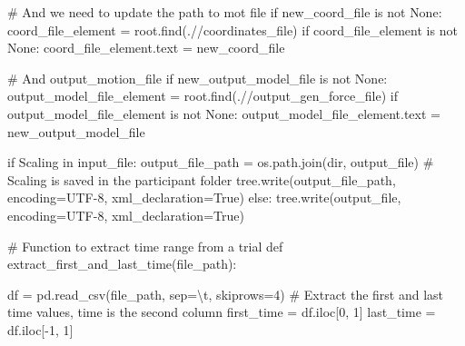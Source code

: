 \documentclass[
  letterpaper,
  DIV=11,
  numbers=noendperiod]{scrreprt}
\newenvironment{Shaded}{\begin{snugshade}}{\end{snugshade}}
\newcommand{\BuiltInTok}[1]{\textcolor[rgb]{0.00,0.23,0.31}{#1}}
\newcommand{\CharTok}[1]{\textcolor[rgb]{0.13,0.47,0.30}{#1}}
\newcommand{\CommentTok}[1]{\textcolor[rgb]{0.37,0.37,0.37}{#1}}
\newcommand{\ControlFlowTok}[1]{\textcolor[rgb]{0.00,0.23,0.31}{#1}}
\newcommand{\DecValTok}[1]{\textcolor[rgb]{0.68,0.00,0.00}{#1}}
\newcommand{\KeywordTok}[1]{\textcolor[rgb]{0.00,0.23,0.31}{#1}}
\newcommand{\NormalTok}[1]{\textcolor[rgb]{0.00,0.23,0.31}{#1}}
\newcommand{\OperatorTok}[1]{\textcolor[rgb]{0.37,0.37,0.37}{#1}}
\newcommand{\StringTok}[1]{\textcolor[rgb]{0.13,0.47,0.30}{#1}}
\newcommand{\VariableTok}[1]{\textcolor[rgb]{0.07,0.07,0.07}{#1}}
\begin{document}
\begin{Shaded}
\begin{Highlighting}[]
        \CommentTok{\# And we need to update the path to mot file}
        \ControlFlowTok{if}\NormalTok{ new\_coord\_file }\KeywordTok{is} \KeywordTok{not} \VariableTok{None}\NormalTok{:}
\NormalTok{            coord\_file\_element }\OperatorTok{=}\NormalTok{ root.find(}\StringTok{\textquotesingle{}.//coordinates\_file\textquotesingle{}}\NormalTok{)}
            \ControlFlowTok{if}\NormalTok{ coord\_file\_element }\KeywordTok{is} \KeywordTok{not} \VariableTok{None}\NormalTok{:}
\NormalTok{                coord\_file\_element.text }\OperatorTok{=}\NormalTok{ new\_coord\_file}

        \CommentTok{\# And output\_motion\_file}
        \ControlFlowTok{if}\NormalTok{ new\_output\_model\_file }\KeywordTok{is} \KeywordTok{not} \VariableTok{None}\NormalTok{:}
\NormalTok{            output\_model\_file\_element }\OperatorTok{=}\NormalTok{ root.find(}\StringTok{\textquotesingle{}.//output\_gen\_force\_file\textquotesingle{}}\NormalTok{)}
            \ControlFlowTok{if}\NormalTok{ output\_model\_file\_element }\KeywordTok{is} \KeywordTok{not} \VariableTok{None}\NormalTok{:}
\NormalTok{                output\_model\_file\_element.text }\OperatorTok{=}\NormalTok{ new\_output\_model\_file}

    \ControlFlowTok{if} \StringTok{\textquotesingle{}Scaling\textquotesingle{}} \KeywordTok{in}\NormalTok{ input\_file:}
\NormalTok{        output\_file\_path }\OperatorTok{=}\NormalTok{ os.path.join(}\BuiltInTok{dir}\NormalTok{, output\_file) }\CommentTok{\# Scaling is saved in the participant folder}
\NormalTok{        tree.write(output\_file\_path, encoding}\OperatorTok{=}\StringTok{\textquotesingle{}UTF{-}8\textquotesingle{}}\NormalTok{, xml\_declaration}\OperatorTok{=}\VariableTok{True}\NormalTok{)}
    \ControlFlowTok{else}\NormalTok{:}
\NormalTok{        tree.write(output\_file, encoding}\OperatorTok{=}\StringTok{\textquotesingle{}UTF{-}8\textquotesingle{}}\NormalTok{, xml\_declaration}\OperatorTok{=}\VariableTok{True}\NormalTok{)}

\CommentTok{\# Function to extract time range from a trial}
\KeywordTok{def}\NormalTok{ extract\_first\_and\_last\_time(file\_path):}

\NormalTok{    df }\OperatorTok{=}\NormalTok{ pd.read\_csv(file\_path, sep}\OperatorTok{=}\StringTok{\textquotesingle{}}\CharTok{\textbackslash{}t}\StringTok{\textquotesingle{}}\NormalTok{, skiprows}\OperatorTok{=}\DecValTok{4}\NormalTok{)}
    \CommentTok{\# Extract the first and last time values, time is the second column}
\NormalTok{    first\_time }\OperatorTok{=}\NormalTok{ df.iloc[}\DecValTok{0}\NormalTok{, }\DecValTok{1}\NormalTok{]}
\NormalTok{    last\_time }\OperatorTok{=}\NormalTok{ df.iloc[}\OperatorTok{{-}}\DecValTok{1}\NormalTok{, }\DecValTok{1}\NormalTok{]}
    

\end{Highlighting}
\end{Shaded}
\end{document}

